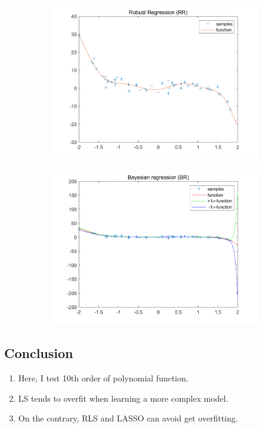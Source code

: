 \documentclass{article}
\begin{document}
\begin{figure}[H]
\begin{subfigure}[b]{0.475\textwidth}
        \includegraphics[width=\textwidth]{fig/1e-rr.png} 
    \end{subfigure}
    \quad
    \begin{subfigure}[b]{0.475\textwidth}   
        \centering 
        \includegraphics[width=\textwidth]{fig/1e-br.png} 
    \end{subfigure}
\end{figure}

\subsection*{Conclusion}
\begin{enumerate}[label=(\roman*)]
    \item Here, I test 10th order of polynomial function.
    \item LS tends to overfit when learning a more complex model.
    \item On the contrary, RLS and LASSO can avoid get overfitting.
\end{enumerate}
\end{document}
